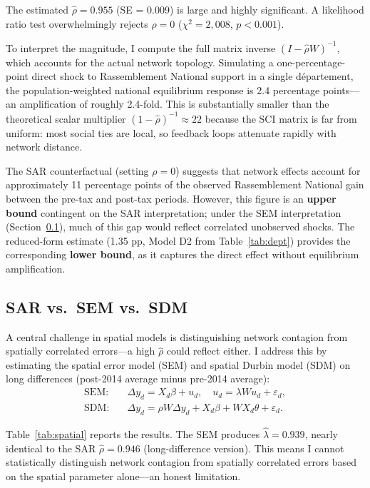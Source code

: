 \documentclass[12pt]{article}
\newcommand{\rn}{Rassemblement National}
\newcommand{\dept}{d\'{e}partement}
\begin{document}
The estimated $\hat{\rho} = 0.955$ (SE = 0.009) is large and highly significant. A likelihood ratio test overwhelmingly rejects $\rho = 0$ ($\chi^2 = 2{,}008$, $p < 0.001$).

To interpret the magnitude, I compute the full matrix inverse $(I - \hat{\rho} W)^{-1}$, which accounts for the actual network topology. Simulating a one-percentage-point direct shock to \rn{} support in a single \dept{}, the population-weighted national equilibrium response is 2.4 percentage points---an amplification of roughly 2.4-fold. This is substantially smaller than the theoretical scalar multiplier $(1 - \hat{\rho})^{-1} \approx 22$ because the SCI matrix is far from uniform: most social ties are local, so feedback loops attenuate rapidly with network distance.

The SAR counterfactual (setting $\rho = 0$) suggests that network effects account for approximately 11 percentage points of the observed \rn{} gain between the pre-tax and post-tax periods. However, this figure is an \textbf{upper bound} contingent on the SAR interpretation; under the SEM interpretation (Section~\ref{sec:sar_sem}), much of this gap would reflect correlated unobserved shocks. The reduced-form estimate (1.35 pp, Model D2 from Table~\ref{tab:dept}) provides the corresponding \textbf{lower bound}, as it captures the direct effect without equilibrium amplification.

\subsection{SAR vs.\ SEM vs.\ SDM}
\label{sec:sar_sem}

A central challenge in spatial models is distinguishing network contagion from spatially correlated errors---a high $\hat{\rho}$ could reflect either. I address this by estimating the spatial error model (SEM) and spatial Durbin model (SDM) on long differences (post-2014 average minus pre-2014 average):
\begin{align}
\text{SEM:} \quad & \Delta y_d = X_d \beta + u_d, \quad u_d = \lambda W u_d + \varepsilon_d, \label{eq:sem} \\
\text{SDM:} \quad & \Delta y_d = \rho W \Delta y_d + X_d \beta + W X_d \theta + \varepsilon_d. \label{eq:sdm}
\end{align}

Table~\ref{tab:spatial} reports the results. The SEM produces $\hat{\lambda} = 0.939$, nearly identical to the SAR $\hat{\rho} = 0.946$ (long-difference version). This means I cannot statistically distinguish network contagion from spatially correlated errors based on the spatial parameter alone---an honest limitation.
\end{document}
